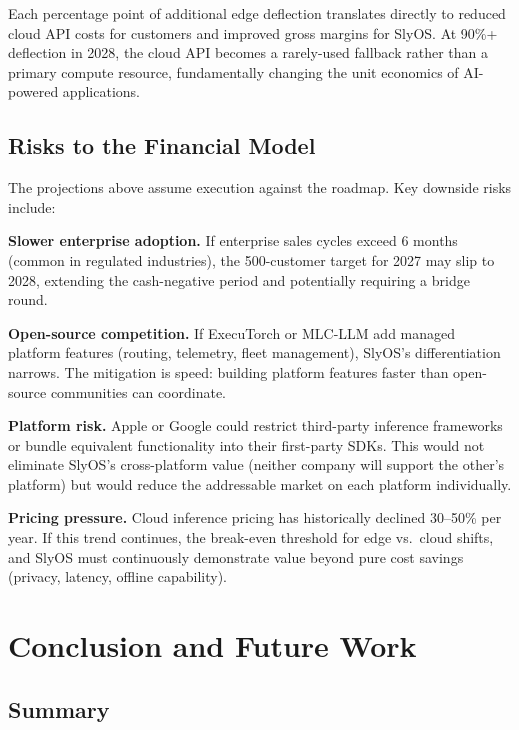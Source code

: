 \documentclass[12pt, letterpaper, twoside]{report}
\begin{document}
Each percentage point of additional edge deflection translates directly to reduced cloud API costs for customers and improved gross margins for SlyOS. At 90\%+ deflection in 2028, the cloud API becomes a rarely-used fallback rather than a primary compute resource, fundamentally changing the unit economics of AI-powered applications.

\section{Risks to the Financial Model}
\label{sec:financial_risks}

The projections above assume execution against the roadmap. Key downside risks include:

\textbf{Slower enterprise adoption.} If enterprise sales cycles exceed 6 months (common in regulated industries), the 500-customer target for 2027 may slip to 2028, extending the cash-negative period and potentially requiring a bridge round.

\textbf{Open-source competition.} If ExecuTorch or MLC-LLM add managed platform features (routing, telemetry, fleet management), SlyOS's differentiation narrows. The mitigation is speed: building platform features faster than open-source communities can coordinate.

\textbf{Platform risk.} Apple or Google could restrict third-party inference frameworks or bundle equivalent functionality into their first-party SDKs. This would not eliminate SlyOS's cross-platform value (neither company will support the other's platform) but would reduce the addressable market on each platform individually.

\textbf{Pricing pressure.} Cloud inference pricing has historically declined 30--50\% per year. If this trend continues, the break-even threshold for edge vs.\ cloud shifts, and SlyOS must continuously demonstrate value beyond pure cost savings (privacy, latency, offline capability).

\chapter{Conclusion and Future Work}
\label{ch:conclusion}

\section{Summary}
\label{sec:summary}
\end{document}

